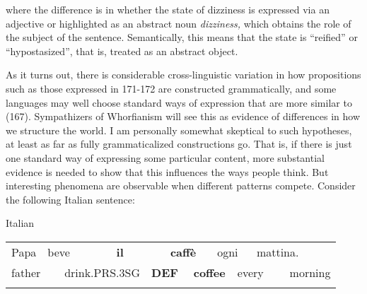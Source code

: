 \begin{styleBodyTextFirst}
where the difference is in whether the state of dizziness is expressed via an adjective or highlighted as an abstract noun \textit{dizziness, }which obtains the role of the subject of the sentence. Semantically, this means that the state is “reified” or “hypostasized”, that is, treated as an abstract object. 

\end{styleBodyTextFirst}

\begin{styleBodytextC}
As it turns out, there is considerable cross-linguistic variation in how propositions such as those expressed in 171{}-172 are constructed grammatically, and some languages may well choose standard ways of expression that are more similar to (167). Sympathizers of Whorfianism will see this as evidence of differences in how we structure the world. I am personally somewhat skeptical to such hypotheses, at least as far as fully grammaticalized constructions go. That is, if there is just one standard way of expressing some particular content, more substantial evidence is needed to show that this influences the ways people think. But interesting phenomena are observable when different patterns compete. Consider the following Italian sentence:

\end{styleBodytextC}

\begin{listWWNumileveli}
\item 

\begin{styleExample}
Italian

\end{styleExample}

\end{listWWNumileveli}

\begin{tabular}{llllllllllll}
\lsptoprule
Papa & \multicolumn{2}{l}{beve

} & \multicolumn{2}{l}{{\bfseries il}

} & \multicolumn{2}{l}{{\bfseries caffè}

} & \multicolumn{2}{l}{ogni

} & \multicolumn{2}{l}{mattina.

} & \\
\multicolumn{2}{l}{father

} & \multicolumn{2}{l}{drink.PRS.3SG

} & \multicolumn{2}{l}{{\bfseries DEF}

} & \multicolumn{2}{l}{{\bfseries coffee}

} & \multicolumn{2}{l}{every

} & \multicolumn{2}{l}{morning

}\\
\lspbottomrule
\end{tabular}

